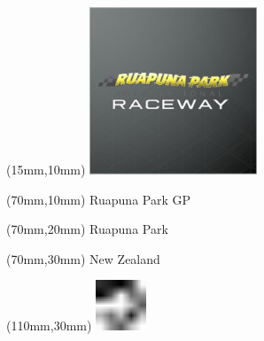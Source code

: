 \null\newpage
\begin{textblock*}{50mm}(15mm,10mm)%
\includegraphics[width=50mm]{LG/RUPU.png}
\end{textblock*}
\begin{textblock*}{130mm}(70mm,10mm)%
{\fontsize{20}{20}\selectfont Ruapuna Park GP}\\
\end{textblock*}
\begin{textblock*}{120mm}(70mm,20mm)%
{\fontsize{16}{16}\selectfont Ruapuna Park}\\
\end{textblock*}
\begin{textblock*}{120mm}(70mm,30mm)%
{\fontsize{12}{12}\selectfont New Zealand}
\end{textblock*}
\begin{textblock*}{30mm}(110mm,30mm)%
\centering
\includegraphics[height=15mm]{icons/fa-rotate-left.pdf}
\end{textblock*}
